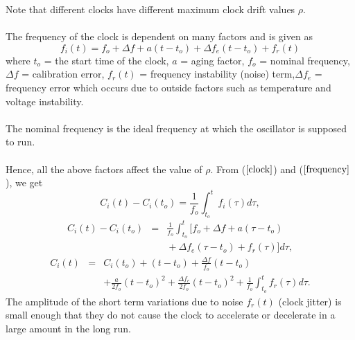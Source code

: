 \documentclass[a4paper,10pt]{report}
\begin{document}
Note that different clocks have different maximum clock drift values
$\rho$.\paragraph*{} The frequency of the clock is dependent on many factors and is given as
\begin{equation}
f_i(t) = f_o + \Delta f + a(t-t_o) + \Delta f_e(t-t_o) + f_r(t)
\label{frequency}
\end{equation}
where \newline $t_o$ = the start time of the clock, \newline $a$ = aging factor, \newline $f_o$ = nominal frequency, \newline $\Delta
f$ = calibration error, \newline $f_r(t)$ = frequency instability (noise) term,\newline $\Delta f_e$ = frequency error which occurs
due to outside factors such as temperature and voltage instability.
\paragraph*{}
The nominal frequency is the ideal frequency at which the oscillator is supposed to run. \paragraph*{} Hence, all the above factors affect the value of $\rho$. From ($\ref{clock}$) and ($\ref{frequency}$), we get
\begin{equation}
C_i(t) - C_i(t_o) = \frac{1}{f_o} \int^{t}_{t_o}f_i(\tau)d\tau ,
\end{equation}
\begin{eqnarray*}
C_i(t) - C_i(t_o) & = & \frac{1}{f_o} \int^{t}_{t_o}{[f_o + \Delta f + a(\tau-t_o)  } \\
 &  & {} + \Delta f_e(\tau-t_o) + f_r(\tau)]d\tau ,
\label{fasika}
\end{eqnarray*}
\begin{eqnarray*}
C_i(t) & = & C_i(t_o) + (t-t_o) +\frac{\Delta f}{f_o}(t-t_o) \\
& & + \frac{a}{2f_o}(t-t_o)^2 + \frac{\Delta f_e}{2f_o}(t-t_o)^2 +
\frac{1}{f_o}\int^{t}_{t_o}{f_r(\tau)d\tau} .
\end{eqnarray*}
The amplitude of the short term variations due to noise $f_r(t)$ (clock
jitter) is small enough that they do not cause the clock to
accelerate or decelerate in a large amount in the long run.
\end{document}
